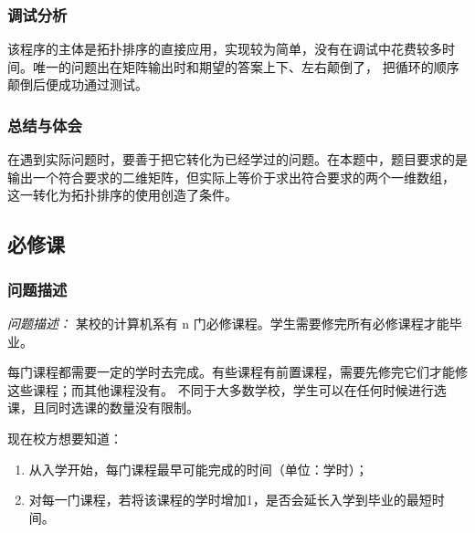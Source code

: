 \documentclass[a4paper,11pt]{article}%
\newenvironment{shadedquotation}
 {\begin{shaded*}
  \quoting[leftmargin=0pt, vskip=0pt]
 }
 {\endquoting
 \end{shaded*}
}
\begin{document}
\subsubsection{调试分析}
该程序的主体是拓扑排序的直接应用，实现较为简单，没有在调试中花费较多时间。唯一的问题出在矩阵输出时和期望的答案上下、左右颠倒了，
把循环的顺序颠倒后便成功通过测试。
\subsubsection{总结与体会}
在遇到实际问题时，要善于把它转化为已经学过的问题。在本题中，题目要求的是输出一个符合要求的二维矩阵，但实际上等价于求出符合要求的两个一维数组，
这一转化为拓扑排序的使用创造了条件。
\subsection{必修课}
\subsubsection{问题描述}
\begin{shadedquotation}
    \emph{问题描述：}
    某校的计算机系有 n 门必修课程。学生需要修完所有必修课程才能毕业。

    每门课程都需要一定的学时去完成。有些课程有前置课程，需要先修完它们才能修这些课程；而其他课程没有。 不同于大多数学校，学生可以在任何时候进行选课，且同时选课的数量没有限制。
    
    现在校方想要知道：
    \begin{enumerate}
    \item 从入学开始，每门课程最早可能完成的时间（单位：学时）；
    \item 对每一门课程，若将该课程的学时增加1，是否会延长入学到毕业的最短时间。
    \end{enumerate}
\end{shadedquotation}
\end{document}
